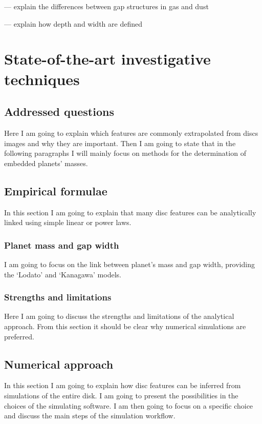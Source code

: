 \documentclass[a4paper,10pt]{report}
\begin{document}
— explain the differences between gap structures in gas and dust 

— explain how depth and width are defined


\chapter{State-of-the-art investigative techniques}


\section{Addressed questions}

Here I am going to explain which features are commonly extrapolated 
from discs images and why they are important.
Then I am going to state that in the following paragraphs I will mainly focus 
on methods for the determination of embedded planets' masses.

\section{Empirical formulae}

In this section I am going to explain that many disc features can be analytically 
linked using simple linear or power laws.

\subsection{Planet mass and gap width}
I am going to focus on the link between planet's mass and gap width,
providing the `Lodato' and `Kanagawa' models.

\subsection{Strengths and limitations}
Here I am going to discuss the strengths and limitations of the analytical approach.
From this section it should be clear why numerical simulations are preferred.

\section{Numerical approach}
In this section I am going to explain how disc features can be inferred 
from simulations of the entire disk. I am going to present the possibilities
in the choices of the simulating software.
I am then going to focus on a specific choice and discuss the main steps of the 
simulation workflow.
\end{document}

